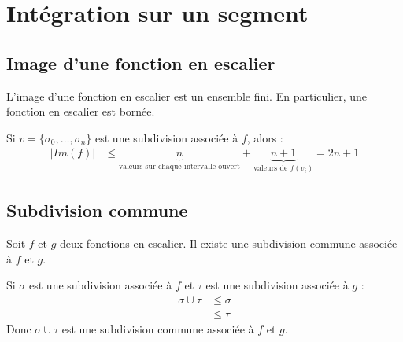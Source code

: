 \documentclass[../main.tex]{subfiles}
\begin{document}
\setcounter{chapter}{25}
\chapter{Intégration sur un segment}
\tableofcontents
\clearpage

\section{Image d'une fonction en escalier}
\begin{tcolorbox}[title=Propostion 26.12, title filled=false, colframe=lightblue, colback=lightblue!10!white]
    L'image d'une fonction en escalier est un ensemble fini. En particulier, une fonction en escalier est bornée. 
\end{tcolorbox}

\noindent Si $v = \{ \sigma_0, \ldots, \sigma_n \}$ est une subdivision associée à $f$, alors : 
\begin{align*}
    |Im(f)| &\leq \underbrace{n}_{\text{valeurs sur chaque intervalle ouvert}} + \underbrace{n + 1}_{\text{valeurs de } f(v_i)} = 2n + 1
\end{align*}

\section{Subdivision commune}
\begin{tcolorbox}[title=Lemme 26.14, title filled=false, colframe=orange, colback=orange!10!white]
    Soit $f$ et $g$ deux fonctions en escalier. Il existe une subdivision commune associée à $f$ et $g$. 
\end{tcolorbox}

\noindent Si $\sigma$ est une subdivision associée à $f$ et $\tau$ est une subdivision associée à $g$ : 
\begin{align*}
    \sigma \cup \tau &\leq \sigma \\
    &\leq \tau
\end{align*}
Donc $\sigma \cup \tau$ est une subdivision commune associée à $f$ et $g$.
\end{document}
